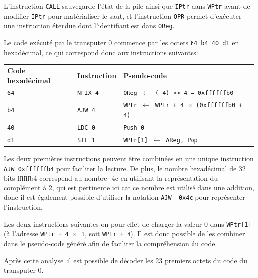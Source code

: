 \documentclass[a4paper,10pt]{article}
\newcommand{\lsl}[1]{\textless{}\textless{} #1} %
\begin{document}
L'instruction \texttt{CALL} sauvegarde l'état de la pile ainsi que \texttt{IPtr} dans \texttt{WPtr} avant de modifier \texttt{IPtr} pour matérialiser le saut, et l'instruction \texttt{OPR} permet d'exécuter une instruction étendue dont l'identifiant est dans \texttt{OReg}.

Le code exécuté par le transputer 0 commence par les octets \texttt{64 b4 40 d1} en hexadécimal, ce qui correspond donc aux instructions suivantes:

\begin{tabular}{lll}
  \textbf{Code hexadécimal} & \textbf{Instruction} & \textbf{Pseudo-code} \\
  \texttt{64} & \texttt{NFIX 4} & \texttt{OReg $\leftarrow$ (\~{}4) \lsl 4 = 0xffffffb0} \\
  \texttt{b4} & \texttt{AJW 4}  & \texttt{WPtr $\leftarrow$ WPtr + 4 $\times$ (0xffffffb0 + 4)} \\
  \texttt{40} & \texttt{LDC 0}  & \texttt{Push 0} \\
  \texttt{d1} & \texttt{STL 1}  & \texttt{WPtr[1] $\leftarrow$ AReg, Pop}
\end{tabular}

Les deux premières instructions peuvent être combinées en une unique instruction \texttt{AJW 0xffffffb4} pour faciliter la lecture.
De plus, le nombre hexadécimal de 32 bits ffffffb4 correspond au nombre -4c en utilisant la représentation du complément à 2, qui est pertinente ici car ce nombre est utilisé dans une addition, donc il est également possible d'utiliser la notation \texttt{AJW -0x4c} pour représenter l'instruction.

Les deux instructions suivantes on pour effet de charger la valeur 0 dans \texttt{WPtr[1]} (à l'adresse \texttt{WPtr + 4 $\times$ 1}, soit \texttt{WPtr + 4}).
Il est donc possible de les combiner dans le pseudo-code généré afin de faciliter la compréhension du code.

Après cette analyse, il est possible de décoder les 23 premiers octets du code du transputer 0.
\end{document}
